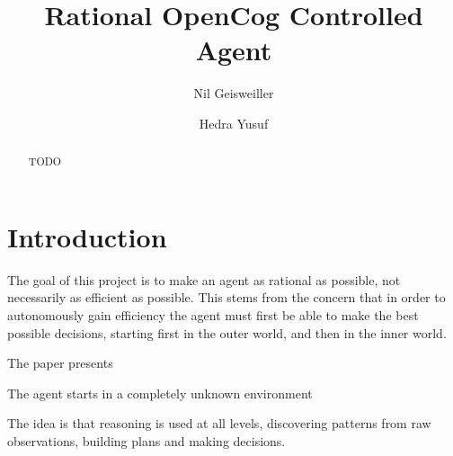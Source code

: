 \documentclass[runningheads]{llncs}
\begin{document}
%
\title{Rational OpenCog Controlled Agent}

%
\author{Nil Geisweiller
  \and Hedra Yusuf}
%
%
%
\maketitle              %
%

\begin{abstract}
  TODO

\end{abstract}

\section{Introduction}

The goal of this project is to make an agent as rational as possible,
not necessarily as efficient as possible.  This stems from the concern
that in order to autonomously gain efficiency the agent must first be
able to make the best possible decisions, starting first in the outer
world, and then in the inner world.


The paper presents

The agent starts in a completely unknown environment

The idea is that reasoning is used at all levels, discovering patterns
from raw observations, building plans and making decisions.
\end{document}
